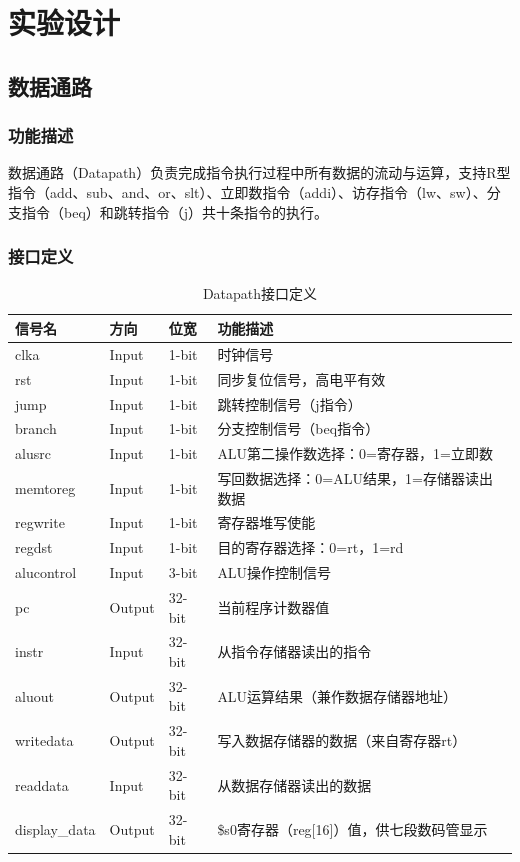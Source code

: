 \section{实验设计}

\subsection{数据通路}\label{sub:datapath}

\subsubsection{功能描述}
数据通路（Datapath）负责完成指令执行过程中所有数据的流动与运算，支持R型指令（add、sub、and、or、slt）、立即数指令（addi）、访存指令（lw、sw）、分支指令（beq）和跳转指令（j）共十条指令的执行。

\subsubsection{接口定义}

\begin{table}[htp]
\caption{Datapath接口定义}\label{tab:datapath}
\begin{center}
\begin{tabular}{|l|l|l|p{6cm}|}
\hline
\textbf{信号名} & \textbf{方向} & \textbf{位宽} & \textbf{功能描述}\\ \hline \hline
clka         & Input  & 1-bit  & 时钟信号 \\ \hline
rst          & Input  & 1-bit  & 同步复位信号，高电平有效 \\ \hline
jump         & Input  & 1-bit  & 跳转控制信号（j指令） \\ \hline
branch       & Input  & 1-bit  & 分支控制信号（beq指令） \\ \hline
alusrc       & Input  & 1-bit  & ALU第二操作数选择：0=寄存器，1=立即数 \\ \hline
memtoreg     & Input  & 1-bit  & 写回数据选择：0=ALU结果，1=存储器读出数据 \\ \hline
regwrite     & Input  & 1-bit  & 寄存器堆写使能 \\ \hline
regdst       & Input  & 1-bit  & 目的寄存器选择：0=rt，1=rd \\ \hline
alucontrol   & Input  & 3-bit  & ALU操作控制信号 \\ \hline
pc           & Output & 32-bit & 当前程序计数器值 \\ \hline
instr        & Input  & 32-bit & 从指令存储器读出的指令 \\ \hline
aluout       & Output & 32-bit & ALU运算结果（兼作数据存储器地址） \\ \hline
writedata    & Output & 32-bit & 写入数据存储器的数据（来自寄存器rt） \\ \hline
readdata     & Input  & 32-bit & 从数据存储器读出的数据 \\ \hline
display\_data & Output & 32-bit & \$s0寄存器（reg[16]）值，供七段数码管显示 \\ \hline
\end{tabular}
\end{center}
\end{table}

